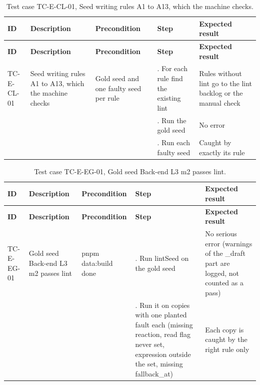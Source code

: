 {\small
\begin{longtable}{|>{\raggedright\arraybackslash}p{}|>{\raggedright\arraybackslash}p{}|>{\raggedright\arraybackslash}p{}|>{\raggedright\arraybackslash}p{}|>{\raggedright\arraybackslash}p{}|}
\caption{Test case TC-E-CL-01, Seed writing rules A1 to A13, which the machine checks.} \\
\hline
\textbf{ID} & \textbf{Description} & \textbf{Precondition} & \textbf{Step} & \textbf{Expected result} \\ \hline
\endfirsthead
\hline
\textbf{ID} & \textbf{Description} & \textbf{Precondition} & \textbf{Step} & \textbf{Expected result} \\ \hline
\endhead
TC-E-CL-01 & Seed writing rules A1 to A13, which the machine checks & Gold seed and one faulty seed per rule & 1. For each rule find the existing lint & Rules without lint go to the lint backlog or the manual check \\ \hline
 &  &  & 2. Run the gold seed & No error \\ \hline
 &  &  & 3. Run each faulty seed & Caught by exactly its rule \\ \hline
\end{longtable}
}

{\small
\begin{longtable}{|>{\raggedright\arraybackslash}p{}|>{\raggedright\arraybackslash}p{}|>{\raggedright\arraybackslash}p{}|>{\raggedright\arraybackslash}p{}|>{\raggedright\arraybackslash}p{}|}
\caption{Test case TC-E-EG-01, Gold seed Back-end L3 m2 passes lint.} \\
\hline
\textbf{ID} & \textbf{Description} & \textbf{Precondition} & \textbf{Step} & \textbf{Expected result} \\ \hline
\endfirsthead
\hline
\textbf{ID} & \textbf{Description} & \textbf{Precondition} & \textbf{Step} & \textbf{Expected result} \\ \hline
\endhead
TC-E-EG-01 & Gold seed Back-end L3 m2 passes lint & pnpm data:build done & 1. Run lintSeed on the gold seed & No serious error (warnings of the \_draft part are logged, not counted as a pass) \\ \hline
 &  &  & 2. Run it on copies with one planted fault each (missing reaction, read flag never set, expression outside the set, missing fallback\_at) & Each copy is caught by the right rule only \\ \hline
\end{longtable}
}

